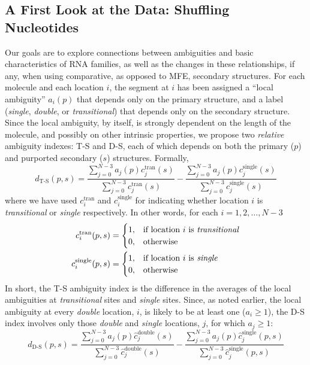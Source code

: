 \documentclass[10pt,letterpaper]{article}
\begin{document}
\subsection*{A First Look at the Data: Shuffling Nucleotides}
Our goals are to explore connections between ambiguities and basic characteristics of RNA families, as well as the changes in these relationships, if any, when using comparative, as opposed to MFE, secondary structures.
For each molecule and each location $i$, the segment at $i$ has been assigned a ``local ambiguity'' $a_i(p)$ that depends only on the primary structure, and a label ({\it single}, {\it double}, or {\it transitional}) that depends only on the secondary structure. Since the local ambiguity, by itself, is strongly dependent on the length of the molecule, and possibly on other intrinsic properties,
we propose two {\em relative} ambiguity indexes: T-S and D-S, each of which depends on both the primary ($p$) and purported secondary ($s$) structures. Formally,
\begin{equation}
	d_\text{T-S}(p, s) = \frac
	{\sum_{j = 0}^{N - 3} a_j (p) 
	c^{\text{tran}}_j (s)}
	{\sum_{j = 0}^{N - 3} 
	c^{\text{tran}}_j (s)} - 
	\frac
	{\sum_{j = 0}^{N - 3} a_j (p) c_j^{\text{single}} (s)}
	{\sum_{j = 0}^{N - 3} c_j^{\text{single}} (s)}
\end{equation}
where we have used
$c_i^{\text{tran}}$ and $c_i^{\text{single}}$ for indicating whether location $i$ is {\it transitional} or {\it single} respectively. In other words, for each $i=1,2,\ldots,N-3$
\begin{align}
	c_i^{\text{tran}}(p, s) &=
	\begin{cases}
		1, & \text{if location $i$ is \textit{transitional}} \\
		0, & \text{otherwise}
	\end{cases} \\
	c_i^{\text{single}}(p, s) &=
	\begin{cases}
		1, & \text{if location $i$ is \textit{single}} \\
		0, & \text{otherwise}
	\end{cases}
\end{align}
In short, the T-S ambiguity index is the difference in the averages of the local ambiguities at {\em transitional} sites and {\em single} sites.
Since, as noted earlier, the local ambiguity at every {\em double} location, $i$, 
is likely to be at least one ($a_i\geq 1$), the D-S index involves only those {\em double} and {\em single} locations, $j$, for which $a_j\geq 1$:
\begin{equation}
	d_\text{D-S}(p, s) = \frac
	{\sum_{j = 0}^{N - 3} a_j (p) 
	\hat{c}^{\text{double}}_j (s)}
	{\sum_{j = 0}^{N - 3} 
	\hat{c}^{\text{double}}_j (s)} - 
	\frac
	{\sum_{j = 0}^{N - 3} a_j (p) \hat{c}_j^{\text{single}} (p,s)}
	{\sum_{j = 0}^{N - 3} \hat{c}_j^{\text{single}} (p,s)}
\end{equation}
\end{document}
